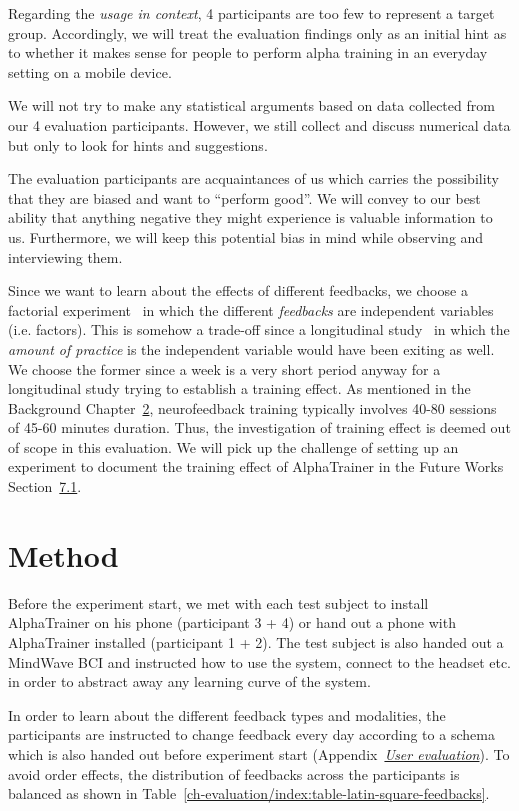 \documentclass[a4paper,10pt,english,lof,lot,twoside]{puthesis}
\begin{document}
Regarding the
\emph{usage in context}, 4 participants are too few to represent a target group. Accordingly, we will treat the evaluation findings only as an initial hint as to whether it makes sense for people to perform alpha training in an everyday setting on a mobile device.

We will not try to make any statistical arguments based on data collected from our 4 evaluation participants. However, we still collect and discuss numerical data but only to look for hints and suggestions.

The evaluation participants are acquaintances of us which carries the possibility that they are biased and want to ``perform good''. We will convey to our best ability that anything negative they might experience is valuable information to us. Furthermore, we will keep this potential bias in mind while observing and interviewing them.

Since we want to learn about the effects of different feedbacks, we choose a factorial experiment \cite{mackenzie_human-computer_2013} in which the different \emph{feedbacks} are independent variables (i.e. factors). This is somehow a trade-off since a longitudinal study \cite{mackenzie_human-computer_2013} in which the \emph{amount of practice} is the independent variable would have been exiting as well. We choose the former since a week is a very short period anyway for a longitudinal study trying to establish a training effect. As mentioned in the Background Chapter {\hyperref[ch-background/index:ch-background]{2}}, neurofeedback training typically involves 40-80 sessions of 45-60 minutes duration. Thus, the investigation of training effect is deemed out of scope in this evaluation. We will pick up the challenge of setting up an experiment to document the training effect of AlphaTrainer in the Future Works Section {\hyperref[ch-conclusion/index:sec-future-work]{7.1}}.


\section{Method}
\label{ch-evaluation/index:method}
Before the experiment start, we met with each test subject to install AlphaTrainer on his phone (participant 3 + 4) or hand out a phone with AlphaTrainer installed (participant 1 + 2). The test subject is also handed out a MindWave BCI and instructed how to use the system, connect to the headset etc. in order to abstract away any learning curve of the system.

In order to learn about the different feedback types and modalities, the participants are instructed to change feedback every day according to a schema which is also handed out before experiment start (Appendix {\hyperref[appendix_evaluation:appendix-final-evaluation]{\emph{User evaluation}}}). To avoid order effects, the distribution of feedbacks across the participants is balanced as shown in Table \ref{ch-evaluation/index:table-latin-square-feedbacks}.
\end{document}
